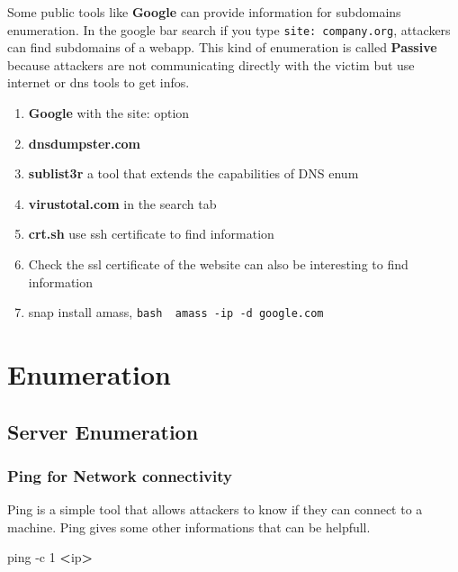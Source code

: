 \documentclass{assets/ipesethesis}
\newenvironment{Shaded}{\begin{snugshade}}{\end{snugshade}}
\newcommand{\FunctionTok}[1]{\textcolor[rgb]{0.00,0.00,0.00}{#1}}
\newcommand{\NormalTok}[1]{#1}
\newcommand{\OperatorTok}[1]{\textcolor[rgb]{0.81,0.36,0.00}{\textbf{#1}}}
\providecommand{\tightlist}{%
  \setlength{\itemsep}{0pt}\setlength{\parskip}{0pt}}
\begin{document}
Some public tools like \textbf{Google} can provide information for subdomains enumeration. In the google bar search if you type \texttt{site:\ company.org}, attackers
can find subdomains of a webapp.
This kind of enumeration is called \textbf{Passive} because attackers are not communicating directly with the victim but use internet or dns tools to get infos.

\begin{enumerate}
\def\labelenumi{\arabic{enumi}.}
\tightlist
\item
  \textbf{Google} with the site: option
\item
  \textbf{dnsdumpster.com}
\item
  \textbf{sublist3r} a tool that extends the capabilities of DNS enum
\item
  \textbf{virustotal.com} in the search tab
\item
  \textbf{crt.sh} use ssh certificate to find information
\item
  Check the ssl certificate of the website can also be interesting to find information
\item
  snap install amass,
  \texttt{bash\ \ amass\ -ip\ -d\ google.com}
\end{enumerate}

\hypertarget{part-enumeration}{%
\part{Enumeration}\label{part-enumeration}}

\hypertarget{server-enumeration}{%
\chapter*{Server Enumeration}\label{server-enumeration}}

\hypertarget{ping-for-network-connectivity}{%
\section*{Ping for Network connectivity}\label{ping-for-network-connectivity}}

Ping is a simple tool that allows attackers to know if they can connect to a machine. Ping gives some other informations that can be helpfull.

\begin{Shaded}
\begin{Highlighting}[]
\FunctionTok{ping}\NormalTok{ -c 1 }\OperatorTok{<}\NormalTok{ip}\OperatorTok{>}
\end{Highlighting}
\end{Shaded}
\end{document}
